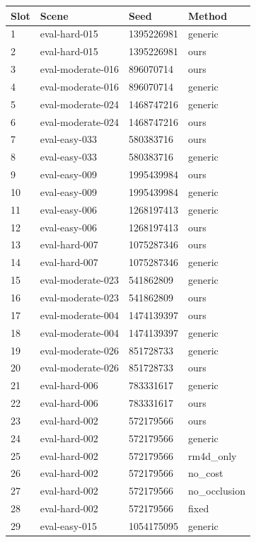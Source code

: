 \begin{tabular}{llll}
\hline
Slot & Scene & Seed & Method \\
\hline
1 & eval-hard-015 & 1395226981 & generic \\
2 & eval-hard-015 & 1395226981 & ours \\
3 & eval-moderate-016 & 896070714 & ours \\
4 & eval-moderate-016 & 896070714 & generic \\
5 & eval-moderate-024 & 1468747216 & generic \\
6 & eval-moderate-024 & 1468747216 & ours \\
7 & eval-easy-033 & 580383716 & ours \\
8 & eval-easy-033 & 580383716 & generic \\
9 & eval-easy-009 & 1995439984 & ours \\
10 & eval-easy-009 & 1995439984 & generic \\
11 & eval-easy-006 & 1268197413 & generic \\
12 & eval-easy-006 & 1268197413 & ours \\
13 & eval-hard-007 & 1075287346 & ours \\
14 & eval-hard-007 & 1075287346 & generic \\
15 & eval-moderate-023 & 541862809 & generic \\
16 & eval-moderate-023 & 541862809 & ours \\
17 & eval-moderate-004 & 1474139397 & ours \\
18 & eval-moderate-004 & 1474139397 & generic \\
19 & eval-moderate-026 & 851728733 & generic \\
20 & eval-moderate-026 & 851728733 & ours \\
21 & eval-hard-006 & 783331617 & generic \\
22 & eval-hard-006 & 783331617 & ours \\
23 & eval-hard-002 & 572179566 & ours \\
24 & eval-hard-002 & 572179566 & generic \\
25 & eval-hard-002 & 572179566 & rm4d\_only \\
26 & eval-hard-002 & 572179566 & no\_cost \\
27 & eval-hard-002 & 572179566 & no\_occlusion \\
28 & eval-hard-002 & 572179566 & fixed \\
29 & eval-easy-015 & 1054175095 & generic \\

\end{tabular}
